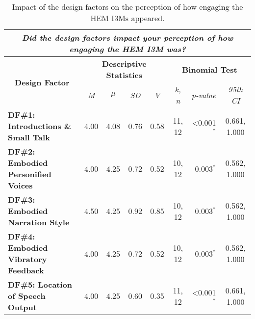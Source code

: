 \begin{table*}[!ht]
\caption{Impact of the design factors on the perception of how engaging the HEM I3Ms appeared.}
\label{table:6}
\begin{tabular}{@{}cccccccc@{}}
\toprule
\multicolumn{8}{c}{\textit{\textbf{Did the design factors impact your perception of how engaging the HEM I3M was?}}}               \\ \midrule
\multicolumn{1}{c|}{\multirow{3}{*}{\textbf{Design Factor}}} &
  \multicolumn{4}{c|}{\multirow{2}{*}{\textbf{Descriptive Statistics}}} &
  \multicolumn{3}{c}{\multirow{2}{*}{\textbf{Binomial Test}}} \\
\multicolumn{1}{c|}{}                                     & \multicolumn{4}{c|}{}                          & \multicolumn{3}{c}{}       \\
\multicolumn{1}{c|}{} &
  \textit{M} &
  \textit{$\mu$} &
  \textit{SD} &
  \multicolumn{1}{c|}{\textit{V}} &
  \textit{k, n} &
  \textit{p-value} &
  \textit{95th CI} \\ \midrule
\multicolumn{1}{l|}{\textbf{DF\#1: Introductions \& Small Talk}} & 4.00 & 4.08 & 0.76 & \multicolumn{1}{c|}{0.58} & 11, 12 & \multicolumn{1}{r}{<0.001$^\ast$} & 0.661, 1.000 \\
\multicolumn{1}{l|}{\textbf{DF\#2: Embodied Personified Voices}} & 4.00 & 4.25 & 0.72 & \multicolumn{1}{c|}{0.52} & 10, 12 & \multicolumn{1}{r}{0.003$^\ast$} & 0.562, 1.000 \\
\multicolumn{1}{l|}{\textbf{DF\#3: Embodied Narration Style}}             & 4.50 & 4.25 & 0.92 & \multicolumn{1}{c|}{0.85} & 10, 12 & \multicolumn{1}{r}{0.003$^\ast$} & 0.562, 1.000 \\
\multicolumn{1}{l|}{\textbf{DF\#4: Embodied Vibratory Feedback}}   & 4.00 & 4.25 & 0.72 & \multicolumn{1}{c|}{0.52} & 10, 12 & \multicolumn{1}{r}{0.003$^\ast$} & 0.562, 1.000 \\
\multicolumn{1}{l|}{\textbf{DF\#5: Location of Speech Output}}                        & 4.00 & 4.25 & 0.60 & \multicolumn{1}{c|}{0.35}                      & 11, 12 & \multicolumn{1}{r}{<0.001$^\ast$} & 0.661, 1.000 \\ \bottomrule
\end{tabular}
\end{table*}